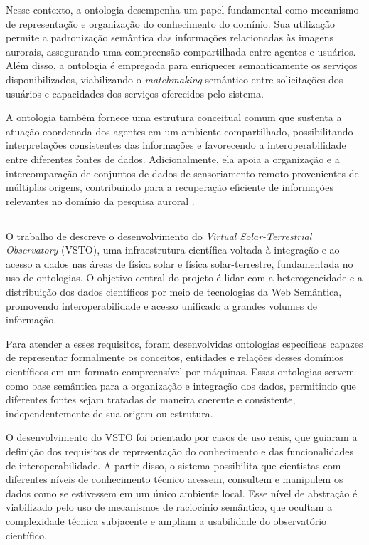 Nesse contexto, a ontologia desempenha um papel fundamental como mecanismo de representação e organização do conhecimento do domínio. Sua utilização permite a padronização semântica das informações relacionadas às imagens aurorais, assegurando uma compreensão compartilhada entre agentes e usuários. Além disso, a ontologia é empregada para enriquecer semanticamente os serviços disponibilizados, viabilizando o \textit{matchmaking} semântico entre solicitações dos usuários e capacidades dos serviços oferecidos pelo sistema.

A ontologia também fornece uma estrutura conceitual comum que sustenta a atuação coordenada dos agentes em um ambiente compartilhado, possibilitando interpretações consistentes das informações e favorecendo a interoperabilidade entre diferentes fontes de dados. Adicionalmente, ela apoia a organização e a intercomparação de conjuntos de dados de sensoriamento remoto provenientes de múltiplas origens, contribuindo para a recuperação eficiente de informações relevantes no domínio da pesquisa auroral \cite{chen2008apply}.

\subsection{\texorpdfstring{\citeauthor{fox2009ontology}}{Fox}}
O trabalho de \citeauthor{fox2009ontology} descreve o desenvolvimento do \textit{Virtual Solar-Terrestrial Observatory} (VSTO), uma infraestrutura científica voltada à integração e ao acesso a dados nas áreas de física solar e física solar-terrestre, fundamentada no uso de ontologias. O objetivo central do projeto é lidar com a heterogeneidade e a distribuição dos dados científicos por meio de tecnologias da Web Semântica, promovendo interoperabilidade e acesso unificado a grandes volumes de informação.

Para atender a esses requisitos, foram desenvolvidas ontologias específicas capazes de representar formalmente os conceitos, entidades e relações desses domínios científicos em um formato compreensível por máquinas. Essas ontologias servem como base semântica para a organização e integração dos dados, permitindo que diferentes fontes sejam tratadas de maneira coerente e consistente, independentemente de sua origem ou estrutura.

O desenvolvimento do VSTO foi orientado por casos de uso reais, que guiaram a definição dos requisitos de representação do conhecimento e das funcionalidades de interoperabilidade. A partir disso, o sistema possibilita que cientistas com diferentes níveis de conhecimento técnico acessem, consultem e manipulem os dados como se estivessem em um único ambiente local. Esse nível de abstração é viabilizado pelo uso de mecanismos de raciocínio semântico, que ocultam a complexidade técnica subjacente e ampliam a usabilidade do observatório científico.


